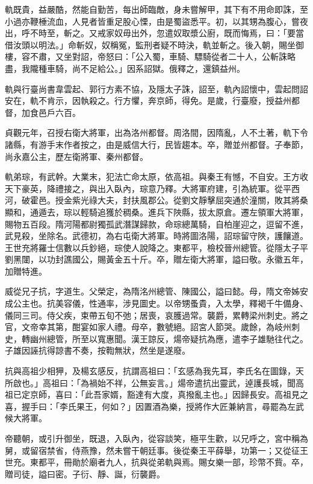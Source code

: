 \begin{pinyinscope}
 軌既貴，益嚴酷，然能自勤苦，每出師臨敵，身未嘗解甲，其下有不用命即誅，至小過亦鞭棰流血，人見者皆重足股心慄，由是蜀盜悉平。初，以其甥為腹心，嘗夜出，呼不時至，斬之。又戒家奴毋出外，忽遣奴取漿公廚，既而悔焉，曰：「要當借汝頭以明法。」命斬奴，奴稱冤，監刑者疑不時決，軌並斬之。後入朝，賜坐御樓，容不肅，又坐對詔，帝怒曰：「公入蜀，車騎、驃騎從者二十人，公斬誅略盡，我隴種車騎，尚不足給公。」因系詔獄。俄釋之，還鎮益州。



 軌與行臺尚書韋雲起、郭行方素不協，及隱太子誅，詔至，軌內詔懷中，雲起問詔安在，軌不肯示，因執殺之。行方懼，奔京師，得免。是歲，行臺廢，授益州都督，加食邑戶六百。



 貞觀元年，召授右衛大將軍，出為洛州都督。周洛間，因隋亂，人不土著，軌下令諸縣，有游手末作者按之，由是威信大行，民皆趨本。卒，贈並州都督。子奉節，尚永嘉公主，歷左衛將軍、秦州都督。



 軌弟琮，有武幹。大業末，犯法亡命太原，依高祖。與秦王有憾，不自安。王方收天下豪英，降禮接之，與出入臥內，琮意乃釋。大將軍府建，引為統軍。從平西河，破霍邑。授金紫光祿大夫，封扶風郡公。從劉文靜擊屈突通於潼關，敗其將桑顯和，通遁去，琮以輕騎追獲於稠桑。進兵下陜縣，拔太原倉。遷左領軍大將軍，賜物五百段。隋河陽都尉獨孤武潛謀歸款，命琮總萬騎，自柏崖迎之，逗留不進，武見殺，坐除名。武德初，為右屯衛大將軍。時將圖洛陽，詔琮留守陜，護饟道。王世充將羅士信數以兵鈔絕，琮使人說降之。東都平，檢校晉州總管。從隱太子平劉黑闥，以功封譙國公，賜黃金五十斤。卒，贈左衛大將軍，謚曰敬。永徽五年，加贈特進。



 威從兄子抗，字道生。父榮定，為隋洺州總管、陳國公，謚曰懿。母，隋文帝姊安成公主也。抗美容儀，性通率，涉見圖史。以帝甥蚤貴，入太學，釋褐千牛備身、儀同三司。侍父疾，束帶五旬不弛；居喪，哀臒過常。襲爵，累轉梁州刺史。將之官，文帝幸其第，酣宴如家人禮。母卒，數號絕。詔宮人節哭。歲餘，為岐州刺史，轉幽州總管，所至以寬惠聞。漢王諒反，煬帝疑抗為應，遣李子雄馳往代之。子雄因誣抗得諒書不奏，按鞫無狀，然坐是遂廢。



 抗與高祖少相狎，及楊玄感反，抗謂高祖曰：「玄感為我先耳，李氏名在圖錄，天所啟也。」高祖曰：「為禍始不祥，公無妄言。」煬帝遣抗出靈武，逴護長城，聞高祖已定京師，喜曰：「此吾家婿，豁達有大度，真撥亂主也。」因歸長安。高祖見之喜，握手曰：「李氏果王，何如？」因置酒為樂，授將作大匠兼納言，尋罷為左武候大將軍。



 帝聽朝，或引升御坐，既退，入臥內，從容談笑，極平生歡，以兄呼之，宮中稱為舅，或留宿禁省，侍燕豫，然未嘗干朝廷事。後從秦王平薛舉，功第一；又從征王世充。東都平，冊勛於廟者九人，抗與從弟軌與焉。賜女樂一部，珍幣不貲。卒，贈司徒，謚曰密。子衍、靜、誕，衍襲爵。




\end{pinyinscope}

